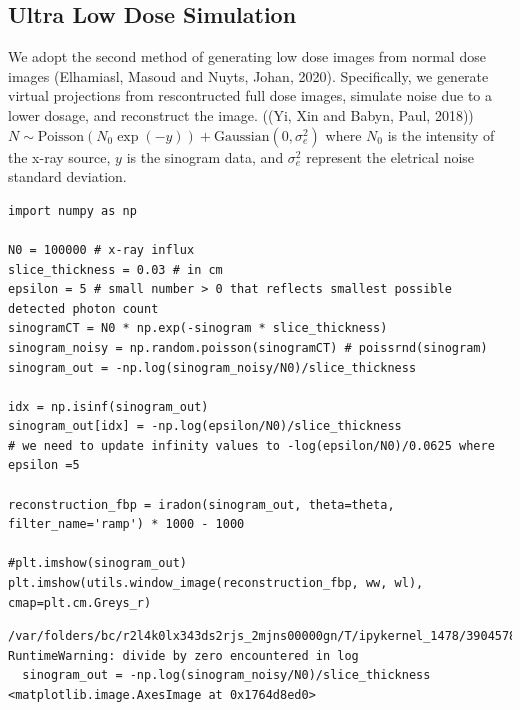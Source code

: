 \documentclass[a4paper, 11pt]{article}
\begin{document}
\subsection{Ultra Low Dose Simulation}
\label{sec:org0a0538c}
We adopt the second method of generating low dose images from normal dose images (Elhamiasl, Masoud and Nuyts, Johan, 2020). Specifically, we generate virtual projections from rescontructed full dose images, simulate noise due to a lower dosage, and reconstruct the image.
((Yi, Xin and Babyn, Paul, 2018)) \(N\sim \text{Poisson}(N_0 \exp(-y)) + \text{Gaussian}(0, \sigma_e^2)\) where \(N_0\) is the intensity of the x-ray source, \(y\) is the sinogram data, and \(\sigma_e^2\) represent the eletrical noise standard deviation.
\begin{verbatim}
import numpy as np

N0 = 100000 # x-ray influx
slice_thickness = 0.03 # in cm
epsilon = 5 # small number > 0 that reflects smallest possible detected photon count
sinogramCT = N0 * np.exp(-sinogram * slice_thickness)
sinogram_noisy = np.random.poisson(sinogramCT) # poissrnd(sinogram)
sinogram_out = -np.log(sinogram_noisy/N0)/slice_thickness

idx = np.isinf(sinogram_out)
sinogram_out[idx] = -np.log(epsilon/N0)/slice_thickness
# we need to update infinity values to -log(epsilon/N0)/0.0625 where epsilon =5

reconstruction_fbp = iradon(sinogram_out, theta=theta, filter_name='ramp') * 1000 - 1000

#plt.imshow(sinogram_out)
plt.imshow(utils.window_image(reconstruction_fbp, ww, wl), cmap=plt.cm.Greys_r)
\end{verbatim}

\begin{verbatim}
/var/folders/bc/r2l4k0lx343ds2rjs_2mjns00000gn/T/ipykernel_1478/3904578395.py:8: RuntimeWarning: divide by zero encountered in log
  sinogram_out = -np.log(sinogram_noisy/N0)/slice_thickness
<matplotlib.image.AxesImage at 0x1764d8ed0>
\end{verbatim}
\end{document}
